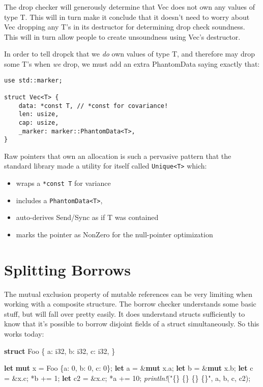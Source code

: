 \documentclass[a4paper,]{book}
\newenvironment{Shaded}{\begin{snugshade}}{\end{snugshade}}
\newcommand{\KeywordTok}[1]{\textcolor[rgb]{0.13,0.29,0.53}{\textbf{{#1}}}}
\newcommand{\DataTypeTok}[1]{\textcolor[rgb]{0.13,0.29,0.53}{{#1}}}
\newcommand{\DecValTok}[1]{\textcolor[rgb]{0.00,0.00,0.81}{{#1}}}
\newcommand{\StringTok}[1]{\textcolor[rgb]{0.31,0.60,0.02}{{#1}}}
\newcommand{\PreprocessorTok}[1]{\textcolor[rgb]{0.56,0.35,0.01}{\textit{{#1}}}}
\newcommand{\NormalTok}[1]{{#1}}
\providecommand{\tightlist}{%
  \setlength{\itemsep}{0pt}\setlength{\parskip}{0pt}}
\begin{document}
The drop checker will generously determine that Vec does not own any
values of type T. This will in turn make it conclude that it doesn't
need to worry about Vec dropping any T's in its destructor for
determining drop check soundness. This will in turn allow people to
create unsoundness using Vec's destructor.

In order to tell dropck that we \emph{do} own values of type T, and
therefore may drop some T's when \emph{we} drop, we must add an extra
PhantomData saying exactly that:

\begin{verbatim}
use std::marker;

struct Vec<T> {
    data: *const T, // *const for covariance!
    len: usize,
    cap: usize,
    _marker: marker::PhantomData<T>,
}
\end{verbatim}

Raw pointers that own an allocation is such a pervasive pattern that the
standard library made a utility for itself called
\texttt{Unique\textless{}T\textgreater{}} which:

\begin{itemize}
\tightlist
\item
  wraps a \texttt{*const\ T} for variance
\item
  includes a \texttt{PhantomData\textless{}T\textgreater{}},
\item
  auto-derives Send/Sync as if T was contained
\item
  marks the pointer as NonZero for the null-pointer optimization
\end{itemize}

\section{Splitting Borrows}\label{sec--borrow-splitting}

The mutual exclusion property of mutable references can be very limiting
when working with a composite structure. The borrow checker understands
some basic stuff, but will fall over pretty easily. It does understand
structs sufficiently to know that it's possible to borrow disjoint
fields of a struct simultaneously. So this works today:

\begin{Shaded}
\begin{Highlighting}[]
\KeywordTok{struct} \NormalTok{Foo \{}
    \NormalTok{a: }\DataTypeTok{i32}\NormalTok{,}
    \NormalTok{b: }\DataTypeTok{i32}\NormalTok{,}
    \NormalTok{c: }\DataTypeTok{i32}\NormalTok{,}
\NormalTok{\}}

\KeywordTok{let} \KeywordTok{mut} \NormalTok{x = Foo \{a: }\DecValTok{0}\NormalTok{, b: }\DecValTok{0}\NormalTok{, c: }\DecValTok{0}\NormalTok{\};}
\KeywordTok{let} \NormalTok{a = &}\KeywordTok{mut} \NormalTok{x.a;}
\KeywordTok{let} \NormalTok{b = &}\KeywordTok{mut} \NormalTok{x.b;}
\KeywordTok{let} \NormalTok{c = &x.c;}
\NormalTok{*b += }\DecValTok{1}\NormalTok{;}
\KeywordTok{let} \NormalTok{c2 = &x.c;}
\NormalTok{*a += }\DecValTok{10}\NormalTok{;}
\PreprocessorTok{println!}\NormalTok{(}\StringTok{"\{\} \{\} \{\} \{\}"}\NormalTok{, a, b, c, c2);}
\end{Highlighting}
\end{Shaded}
\end{document}
